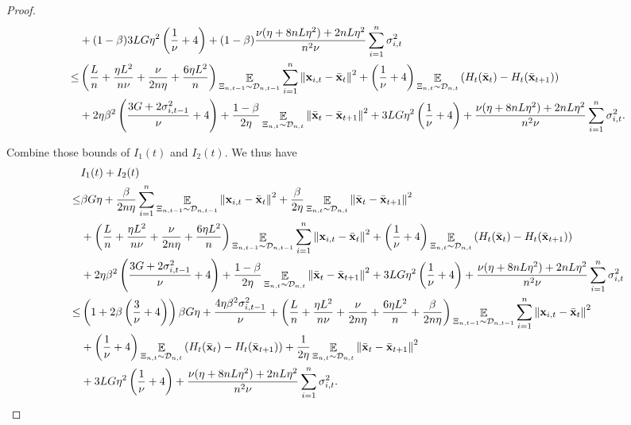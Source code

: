 \documentclass{article}
\begin{document}
\begin{proof}
\begin{align}
& + (1-\beta)3LG\eta^2 \left(  \frac{1}{\nu} + 4  \right)  + (1-\beta)\frac{\nu(\eta + 8nL\eta^2) + 2nL\eta^2}{n^2\nu} \sum_{i=1}^n\sigma_{i,t}^2 \\ \nonumber
\le &  \left(  \frac{L}{n} + \frac{\eta L^2}{n\nu} + \frac{\nu}{2n\eta} + \frac{6\eta L^2}{n}  \right)\mathop{\mathbb{E}}_{ \Xi_{n,t-1} \sim \mathcal{D}_{n,t-1} }\sum_{i=1}^n\left\lVert{\bf x}_{i,t} - \bar{{\bf x}}_t \right\rVert^2  + \left( \frac{1}{\nu} + 4 \right)\mathop{\mathbb{E}}_{ \Xi_{n,t} \sim \mathcal{D}_{n,t} } \left( H_t(\bar{{\bf x}}_t) - H_t(\bar{{\bf x}}_{t+1}) \right)\\ \nonumber 
&+  2\eta\beta^2\left( \frac{3G + 2\sigma_{i,t-1}^2}{\nu} + 4 \right) +  \frac{1-\beta}{2\eta} \mathop{\mathbb{E}}_{ \Xi_{n,t} \sim \mathcal{D}_{n,t} }\left\lVert \bar{{\bf x}}_t - \bar{{\bf x}}_{t+1}\right\rVert^2   + 3LG\eta^2 \left(  \frac{1}{\nu} + 4  \right)  + \frac{\nu(\eta + 8nL\eta^2) + 2nL\eta^2}{n^2\nu} \sum_{i=1}^n\sigma_{i,t}^2.
\end{align}





Combine those bounds of $I_1(t)$ and $I_2(t)$. We thus have
\begin{align}
\nonumber
& I_1(t) + I_2(t) \\ \nonumber 
\le & \beta G \eta + \frac{\beta}{2n\eta }\sum_{i=1}^n \mathop{\mathbb{E}}_{ \Xi_{n,t-1} \sim \mathcal{D}_{n,t-1} }\left\lVert{\bf x}_{i,t} - \bar{{\bf x}}_t\right\rVert^2 + \frac{\beta }{2\eta } \mathop{\mathbb{E}}_{ \Xi_{n,t} \sim \mathcal{D}_{n,t} }\left\lVert\bar{{\bf x}}_t - \bar{{\bf x}}_{t+1}\right\rVert^2 \\ \nonumber
& +  \left(  \frac{L}{n} + \frac{\eta L^2}{n\nu} + \frac{\nu}{2n\eta} + \frac{6\eta L^2}{n}  \right)\mathop{\mathbb{E}}_{ \Xi_{n,t-1} \sim \mathcal{D}_{n,t-1} }\sum_{i=1}^n\left\lVert{\bf x}_{i,t} - \bar{{\bf x}}_t \right\rVert^2 + \left( \frac{1}{\nu} + 4 \right)\mathop{\mathbb{E}}_{ \Xi_{n,t} \sim \mathcal{D}_{n,t} } \left( H_t(\bar{{\bf x}}_t) - H_t(\bar{{\bf x}}_{t+1}) \right)\\ \nonumber 
&+ 2\eta\beta^2\left( \frac{3G + 2\sigma_{i,t-1}^2}{\nu} + 4 \right) +  \frac{1-\beta}{2\eta} \mathop{\mathbb{E}}_{ \Xi_{n,t} \sim \mathcal{D}_{n,t} }\left\lVert \bar{{\bf x}}_t - \bar{{\bf x}}_{t+1}\right\rVert^2 + 3LG\eta^2\left(  \frac{1}{\nu} + 4  \right) + \frac{\nu(\eta + 8nL\eta^2) + 2nL\eta^2}{n^2\nu} \sum_{i=1}^n\sigma_{i,t}^2\\ \nonumber
\le & \left( 1 + 2\beta\left( \frac{3}{\nu}+4 \right) \right)\beta G \eta + \frac{4\eta \beta^2 \sigma_{i,t-1}^2}{\nu} + \left(  \frac{L}{n} + \frac{\eta L^2}{n\nu} + \frac{\nu}{2n\eta} + \frac{6\eta L^2}{n}  + \frac{\beta}{2n\eta}  \right)\mathop{\mathbb{E}}_{ \Xi_{n,t-1} \sim \mathcal{D}_{n,t-1} }\sum_{i=1}^n\left\lVert{\bf x}_{i,t} - \bar{{\bf x}}_t \right\rVert^2 \\ \nonumber 
&+ \left( \frac{1}{\nu} + 4 \right)\mathop{\mathbb{E}}_{ \Xi_{n,t} \sim \mathcal{D}_{n,t} } \left( H_t(\bar{{\bf x}}_t) - H_t(\bar{{\bf x}}_{t+1}) \right) + \frac{1}{2\eta}\mathop{\mathbb{E}}_{ \Xi_{n,t} \sim \mathcal{D}_{n,t} }\left\lVert \bar{{\bf x}}_t - \bar{{\bf x}}_{t+1}\right\rVert^2 \\ \nonumber 
& + 3LG\eta^2\left(  \frac{1}{\nu} + 4  \right) + \frac{\nu(\eta + 8nL\eta^2) + 2nL\eta^2}{n^2\nu} \sum_{i=1}^n\sigma_{i,t}^2.
\end{align}


\end{proof}
\end{document}
